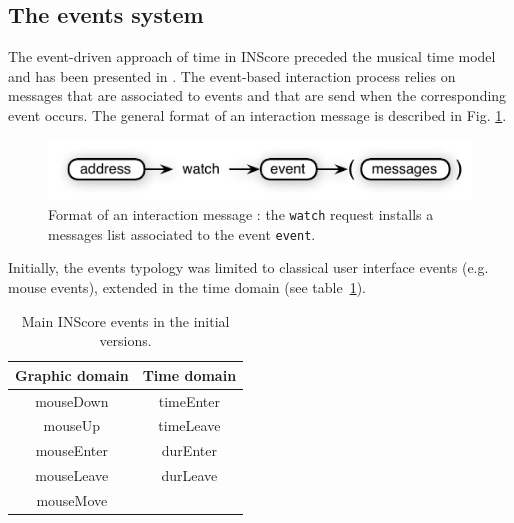 \documentclass[11pt,a4paper]{article}
\newcommand{\OSC}[1]	{{\fontsize{10pt}{10pt} \selectfont\texttt{#1}}}
\begin{document}
\subsection{The events system}
\label{events}

The event-driven approach of time in INScore preceded the musical time model and has been presented in \cite{Fober:13b}. 
The event-based interaction process relies on messages that are associated to events and that are send when the corresponding event occurs. The general format of an interaction message is described in Fig. \ref{fig:watch}.

\begin{figure}[ht]
\centerline{
	\includegraphics[width=0.95\columnwidth]{imgs/watch}}
\caption{Format of an interaction message : the \OSC{watch} request installs a messages list associated to the event \OSC{event}.}
\label{fig:watch}
\end{figure}

Initially, the events typology was limited to classical user interface events (e.g. mouse events), extended in the time domain (see table~\ref{tbl:evts}). 

\begin{table}[htp]
\begin{center}
\begin{tabular}{c|c}
Graphic domain & Time domain \\
\hline
mouseDown 		& timeEnter	\\
mouseUp			& timeLeave	\\
mouseEnter		& durEnter		\\
mouseLeave		& durLeave		\\
mouseMove		&				\\
\end{tabular}
\end{center}
\caption{Main INScore events in the initial versions.}
\label{tbl:evts}
\end{table}%
\end{document}
